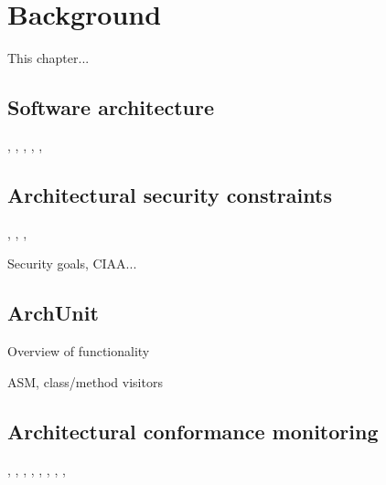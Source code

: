 \chapter{Background}

This chapter...

\section{Software architecture}
\cite{ambriola_introduction_1993}, \cite{jansen_software_2005}, \cite{bass_software_2013}, \cite{scandariato_architecting_2009}, \cite{nguyen_sospa_2015}, 

\section{Architectural security constraints}
\cite{broy_software_2007}, \cite{felderer_security_2016}, \cite{haley_security_2008}, 

Security goals, CIAA...

\section{ArchUnit}\label{archunit-back-section}

Overview of functionality

ASM, class/method visitors

\section{Architectural conformance monitoring}
\cite{aldrich_archjava_2002}, \cite{abi-antoun_analyzing_2010}, \cite{luckham_event-based_1995}, \cite{abi-antoun_static_2009}, \cite{de_silva_controlling_2012}, \cite{knodel_comparison_2007}, \cite{jansen_documenting_2008}, \cite{hong_yan_discotect_2004}, 




